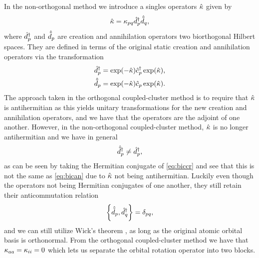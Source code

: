             In the non-orthogonal method we introduce a singles operators
            $\hat{\kappa}$ given by
            \begin{align}
                \hat{\kappa} = \kappa_{pq}\hat{d}^{\dagger}_{p}\hat{\tilde{d}}_{q},
            \end{align}
            where $\hat{d}^{\dagger}_{p}$ and $\hat{\tilde{d}}_{p}$ are creation and annihilation
            operators two biorthogonal Hilbert spaces.
            They are defined in terms of the original static creation and
            annihilation operators via the transformation
            \cite{helgaker-molecular, rolf-nocc}
            \begin{gather}
                \biccr{p}
                = \exponential(-\nocc)\ccr{p}\exponential(\nocc),
                \label{eq:biccr}
                \\
                \bican{p}
                = \exponential(-\nocc)\can{p}\exponential(\nocc).
                \label{eq:bican}
            \end{gather}
            The approach taken in the orthogonal coupled-cluster method is to
            require that $\hat{\kappa}$ is antihermitian as this yields unitary
            transformations for the new creation and annihilation operators, and
            we have that the operators are the adjoint of one another.
            However, in the non-orthogonal coupled-cluster method, $\hat{\kappa}$ is no
            longer antihermitian and we have in general
            \begin{align}
                \hat{\tilde{d}}_{p}^{\dagger} \neq \hat{d}^{\dagger}_{p},
            \end{align}
            as can be seen by taking the Hermitian conjugate of
            \autoref{eq:biccr} and see that this is not the same as
            \autoref{eq:bican} due to $\hat{\kappa}$ not being antihermitian.
            Luckily even though the operators not being Hermitian conjugates of
            one another, they still retain their anticommutation relation
            \cite{balian1969, lowdin-bi}
            \begin{align}
                \left\{\hat{\tilde{d}}_{p}, \hat{d}^{\dagger}_{q}\right\} = \delta_{pq},
            \end{align}
            and we can still utilize Wick's theorem \cite{rolf-nocc,
            kvaal2012ab}, as long as the original atomic orbital basis is
            orthonormal.
            From the orthogonal coupled-cluster method we have that
            $\kappa_{aa} = \kappa_{ii} = 0$ which lets us separate the
            orbital rotation operator into two blocks.
